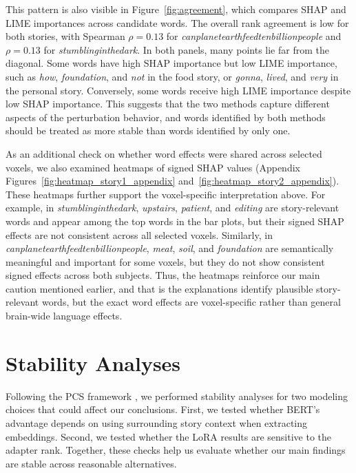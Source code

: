 \documentclass[11pt]{article}
\begin{document}
This pattern is also visible in Figure~\ref{fig:agreement}, which compares SHAP and LIME importances across candidate words. The overall rank agreement is low for both stories, with Spearman \(\rho=0.13\) for \textit{canplanetearthfeedtenbillionpeople} and \(\rho=0.13\) for \textit{stumblinginthedark}. In both panels, many points lie far from the diagonal. Some words have high SHAP importance but low LIME importance, such as \textit{how}, \textit{foundation}, and \textit{not} in the food story, or \textit{gonna}, \textit{lived}, and \textit{very} in the personal story. Conversely, some words receive high LIME importance despite low SHAP importance. This suggests that the two methods capture different aspects of the perturbation behavior, and words identified by both methods should be treated as more stable than words identified by only one.

As an additional check on whether word effects were shared across selected voxels, we also examined heatmaps of signed SHAP values (Appendix Figures~\ref{fig:heatmap_story1_appendix} and~\ref{fig:heatmap_story2_appendix}). These heatmaps further support the voxel-specific interpretation above. For example, in \textit{stumblinginthedark}, \textit{upstairs}, \textit{patient}, and \textit{editing} are story-relevant words and appear among the top words in the bar plots, but their signed SHAP effects are not consistent across all selected voxels. Similarly, in \textit{canplanetearthfeedtenbillionpeople}, \textit{meat}, \textit{soil}, and \textit{foundation} are semantically meaningful and important for some voxels, but they do not show consistent signed effects across both subjects. Thus, the heatmaps reinforce our main caution mentioned earlier, and that is the explanations identify plausible story-relevant words, but the exact word effects are voxel-specific rather than general brain-wide language effects.

\section{Stability Analyses}
Following the PCS framework \cite{yu2024}, we performed stability analyses for two modeling choices that could affect our conclusions. First, we tested whether BERT's advantage depends on using surrounding story context when extracting embeddings. Second, we tested whether the LoRA results are sensitive to the adapter rank. Together, these checks help us evaluate whether our main findings are stable across reasonable alternatives.
\end{document}

